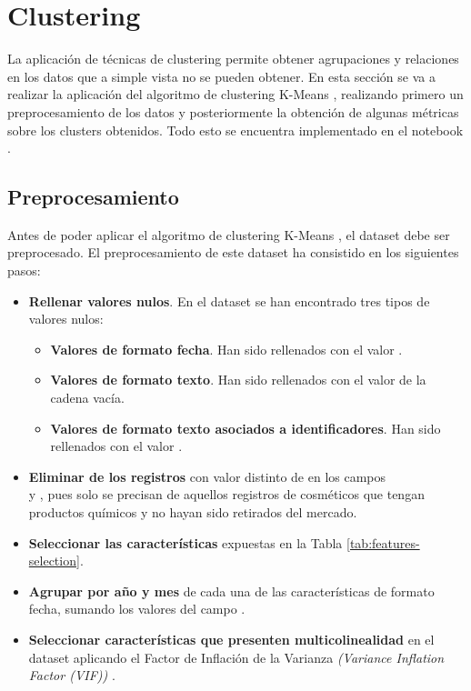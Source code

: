 
\section{Clustering}
\label{sec:results-clustering}

La aplicación de técnicas de clustering permite obtener agrupaciones y relaciones en los datos que a simple vista no se pueden obtener. En esta sección se va a realizar la aplicación del algoritmo de clustering K-Means \citep{scikit-learn}, realizando primero un preprocesamiento de los datos y posteriormente la obtención de algunas métricas sobre los clusters obtenidos. Todo esto se encuentra implementado en el notebook \\  \citep{master}.


\subsection{Preprocesamiento}
\label{sec:clustering-preprocessing}

Antes de poder aplicar el algoritmo de clustering K-Means \citep{scikit-learn}, el dataset debe ser preprocesado. El preprocesamiento de este dataset ha consistido en los siguientes pasos:

\begin{itemize}
 \item \textbf{Rellenar valores nulos}. En el dataset se han encontrado tres tipos de valores nulos: 
 \begin{itemize}
  \item \textbf{Valores de formato fecha}. Han sido rellenados con el valor .
  \item \textbf{Valores de formato texto}. Han sido rellenados con el valor de la cadena vacía.
  \item \textbf{Valores de formato texto asociados a identificadores}. Han sido rellenados con el valor .
 \end{itemize}
 
 \item \textbf{Eliminar de los registros} con valor distinto de  en los campos \\  y , pues solo se precisan de aquellos registros de cosméticos que tengan productos químicos y no hayan sido retirados del mercado.

 \item \textbf{Seleccionar las características} expuestas en la Tabla \ref{tab:features-selection}.
 \item \textbf{Agrupar por año y mes} de cada una de las características de formato fecha, sumando los valores del campo .
 \item \textbf{Seleccionar características que presenten multicolinealidad} en el dataset aplicando el Factor de Inflación de la Varianza \textit{(Variance Inflation Factor (VIF))} \citep{vif}.
\end{itemize}

